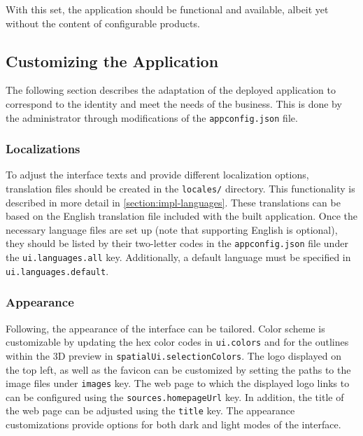 With this set, the application should be functional and available, albeit yet without the content of configurable products.


\subsection{Customizing the Application}

The following section describes the adaptation of the deployed application to correspond to the identity and meet the needs of the business. This is done by the administrator through modifications of the \texttt{appconfig.json} file.


\subsubsection{Localizations}

To adjust the interface texts and provide different localization options, translation files should be created in the \texttt{locales/} directory. This functionality is described in more detail in \autoref{section:impl-languages}. These translations can be based on the English translation file included with the built application. Once the necessary language files are set up (note that supporting English is optional), they should be listed by their two-letter codes in the \texttt{appconfig.json} file under the \texttt{ui.languages.all} key. Additionally, a default language must be specified in \texttt{ui.languages.default}.


\subsubsection{Appearance}

Following, the appearance of the interface can be tailored. Color scheme is customizable by updating the hex color codes in \texttt{ui.colors} and for the outlines within the 3D preview in \texttt{spatialUi.selectionColors}. The logo displayed on the top left, as well as the favicon can be customized by setting the paths to the image files under \texttt{images} key. The web page to which the displayed logo links to can be configured using the \texttt{sources.homepageUrl} key. In addition, the title of the web page can be adjusted using the \texttt{title} key. The appearance customizations provide options for both dark and light modes of the interface.


